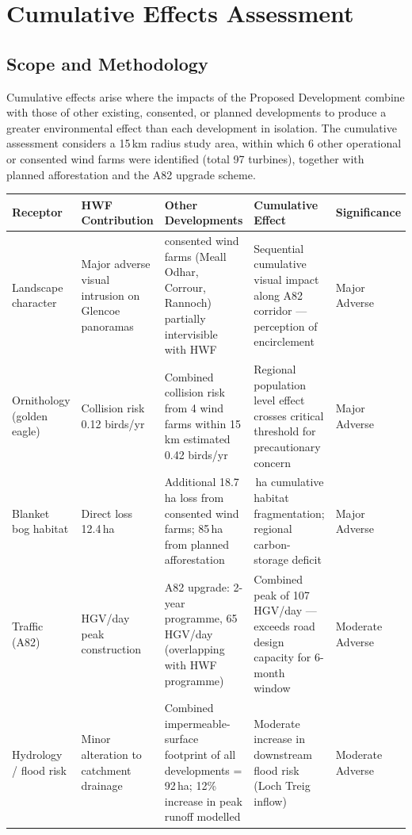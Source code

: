 \section{Cumulative Effects Assessment}

\subsection{Scope and Methodology}
Cumulative effects arise where the impacts of the Proposed Development combine with those of other existing, consented, or planned developments to produce a greater environmental effect than each development in isolation. The cumulative assessment considers a 15\,km radius study area, within which 6 other operational or consented wind farms were identified (total 97 turbines), together with planned afforestation and the A82 upgrade scheme.

\vspace{8pt}
\renewcommand{\arraystretch}{1.35}
\footnotesize
\begin{tabularx}{\linewidth}{@{}>{\raggedright\arraybackslash}p{2.2cm} >{\raggedright\arraybackslash}X >{\raggedright\arraybackslash}X >{\raggedright\arraybackslash}p{2.4cm} >{\raggedright\arraybackslash}p{2cm} @{}}
\toprule
\rowcolor{accent}
\color{white}\bfseries Receptor & \color{white}\bfseries HWF Contribution & \color{white}\bfseries Other Developments & \color{white}\bfseries Cumulative Effect & \color{white}\bfseries Significance \\
\midrule
\rowcolor{rowshade}
Landscape character & Major adverse visual intrusion on Glencoe panoramas & 3 consented wind farms (Meall Odhar, Corrour, Rannoch) partially intervisible with HWF & Sequential cumulative visual impact along A82 corridor --- perception of encirclement & Major Adverse \\
Ornithology (golden eagle) & Collision risk 0.12 birds/yr & Combined collision risk from 4 wind farms within 15\,km estimated 0.42 birds/yr & Regional population level effect crosses critical threshold for precautionary concern & Major Adverse \\
\rowcolor{rowshade}
Blanket bog habitat & Direct loss 12.4\,ha & Additional 18.7\,ha loss from consented wind farms; 85\,ha from planned afforestation & 116.1\,ha cumulative habitat fragmentation; regional carbon-storage deficit & Major Adverse \\
Traffic (A82) & 42 HGV/day peak construction & A82 upgrade: 2-year programme, 65 HGV/day (overlapping with HWF programme) & Combined peak of 107 HGV/day --- exceeds road design capacity for 6-month window & Moderate Adverse \\
\rowcolor{rowshade}
Hydrology / flood risk & Minor alteration to catchment drainage & Combined impermeable-surface footprint of all developments = 92\,ha; 12\% increase in peak runoff modelled & Moderate increase in downstream flood risk (Loch Treig inflow) & Moderate Adverse \\
\midrule
\bottomrule
\end{tabularx}

